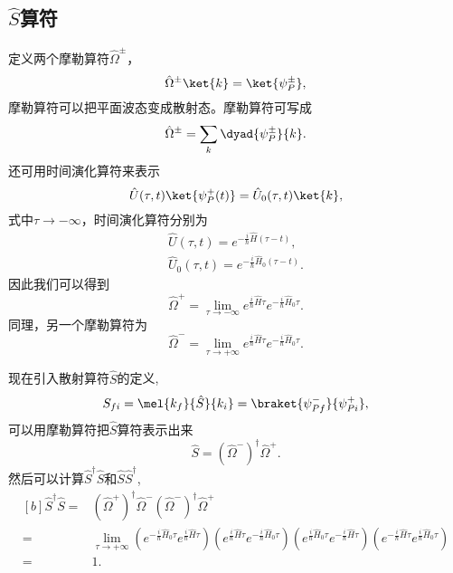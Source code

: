 \subsection{$\hat{S}$算符}
定义两个摩勒算符$\hat{\Omega}^{\pm}$，
\begin{equation}
\label{moller operations}
\hat{\Omega}^{\pm}\ket{k}=\ket{\psi_P^{\pm}},
\end{equation}
摩勒算符可以把平面波态变成散射态。摩勒算符可写成
\begin{equation}
	\label{moller operations def}
	\hat{\Omega}^{\pm}=\sum_{k}\dyad{\psi_P^{\pm}}{k}.
\end{equation}
还可用时间演化算符来表示\cite{weinberg1995quantum}
\begin{equation}
	\hat{U}(\tau,t)\ket{\psi_P^{+}(t)}=\hat{U}_{0}(\tau,t)\ket{k},
\end{equation}
式中$\tau\to-\infty$，时间演化算符分别为
\begin{equation}
\begin{split}
	\hat{U}(\tau,t)=e^{-\frac{i}{\hbar}\hat{H}(\tau-t)},\\
	\hat{U}_{0}(\tau,t)=e^{-\frac{i}{\hbar}\hat{H}_{0}(\tau-t)}.
\end{split}
\end{equation}
因此我们可以得到
\begin{equation}
	\hat{\Omega}^{+}=\lim_{\tau\to-\infty}e^{\frac{i}{\hbar }\hat{H}\tau}e^{-\frac{i}{\hbar }\hat{H}_{0}\tau}.
\end{equation}
同理，另一个摩勒算符为
\begin{equation}
	\hat{\Omega}^{-}=\lim_{\tau\to+\infty}e^{\frac{i}{\hbar }\hat{H}\tau}e^{-\frac{i}{\hbar }\hat{H}_{0}\tau}.
\end{equation}\par
现在引入散射算符$\hat{S}$的定义,
\begin{equation}
\label{S matrix}
S_{fi}=\mel{k_{f}}{\hat{S}}{k_{i}}=\braket{\psi^{-}_{Pf}}{\psi^{+}_{Pi}},
\end{equation}
可以用摩勒算符把$\hat{S}$算符表示出来
\begin{equation}
	\hat{S}=(\hat{\Omega}^{-})^{\dagger}\hat{\Omega}^{+}.
\end{equation}
然后可以计算$\hat{S}^{\dagger}\hat{S}$和$\hat{S}\hat{S}^{\dagger}$,
\begin{equation}
	\begin{aligned}[b]
	\hat{S}^{\dagger}\hat{S}=&(\hat{\Omega}^{+})^{\dagger}\hat{\Omega}^{-}(\hat{\Omega}^{-})^{\dagger}\hat{\Omega}^{+}\\
	=&\lim_{\tau\to+\infty}(e^{-\frac{i}{\hbar }\hat{H}_{0}\tau}e^{\frac{i}{\hbar }\hat{H}\tau})(e^{\frac{i}{\hbar }\hat{H}\tau}e^{-\frac{i}{\hbar }\hat{H}_{0}\tau})(e^{\frac{i}{\hbar }\hat{H}_{0}\tau}e^{-\frac{i}{\hbar }\hat{H}\tau})(e^{-\frac{i}{\hbar }\hat{H}\tau}e^{\frac{i}{\hbar }\hat{H}_{0}\tau})\\
	=&1.
	\end{aligned}
\end{equation}
